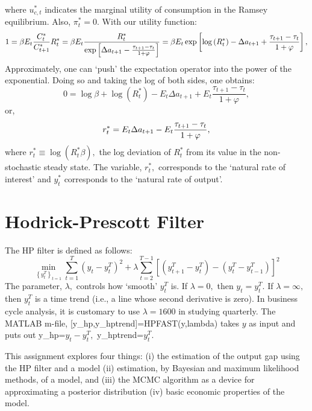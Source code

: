 \documentclass[12pt,thmsa]{article}
\begin{document}
where $u_{c,t}^{\ast }$ indicates the marginal utility of consumption in the
Ramsey equilibrium. Also, $\pi _{t}^{\ast }=0.$ With our utility function:%
\begin{equation*}
1=\beta E_{t}\frac{C_{t}^{\ast }}{C_{t+1}^{\ast }}R_{t}^{\ast }=\beta E_{t}%
\frac{R_{t}^{\ast }}{\exp \left[ \Delta a_{t+1}-\frac{\tau _{t+1}-\tau _{t}}{%
1+\varphi }\right] }=\beta E_{t}\exp \left[ \log \left( R_{t}^{\ast }\right)
-\Delta a_{t+1}+\frac{\tau _{t+1}-\tau _{t}}{1+\varphi }\right] ,
\end{equation*}%
Approximately, one can `push' the expectation operator into the power of the
exponential. Doing so and taking the log of both sides, one obtains:%
\begin{equation*}
0=\log \beta +\log \left( R_{t}^{\ast }\right) -E_{t}\Delta a_{t+1}+E_{t}%
\frac{\tau _{t+1}-\tau _{t}}{1+\varphi },
\end{equation*}%
or,%
\begin{equation*}
r_{t}^{\ast }=E_{t}\Delta a_{t+1}-E_{t}\frac{\tau _{t+1}-\tau _{t}}{%
1+\varphi },
\end{equation*}%
where $r_{t}^{\ast }\equiv \log \left( R_{t}^{\ast }\beta \right) ,$ the log
deviation of $R_{t}^{\ast }$ from its value in the non-stochastic steady
state. The variable, $r_{t}^{\ast },$ corresponds to the `natural rate of
interest' and $y_{t}^{\ast }$ corresponds to the `natural rate of output'.

\section{Hodrick-Prescott Filter}

The HP filter is defined as follows:%
\begin{equation*}
\min_{\left\{ y_{t}^{T}\right\} _{t=1}}\sum_{t=1}^{T}\left(
y_{t}-y_{t}^{T}\right) ^{2}+\lambda \sum_{t=2}^{T-1}\left[ \left(
y_{t+1}^{T}-y_{t}^{T}\right) -\left( y_{t}^{T}-y_{t-1}^{T}\right) \right]
^{2}
\end{equation*}%
The parameter, $\lambda ,$ controls how `smooth' $y_{t}^{T}$ is. If $\lambda
=0,$ then $y_{t}=y_{t}^{T}.$ If $\lambda =\infty ,$ then $y_{t}^{T}$ is a
time trend (i.e., a line whose second derivative is zero). In business cycle
analysis, it is customary to use $\lambda =1600$ in studying quarterly. The
MATLAB m-file, [y\_hp,y\_hptrend]=HPFAST(y,lambda) takes $y$ as input and
puts out y\_hp=$y_{t}-y_{t}^{T},$ y\_hptrend=$y_{t}^{T}.$

This assignment explores four things: (i) the estimation of the output gap
using the HP filter and a model (ii) estimation, by Bayesian and maximum
likelihood methods, of a model, and (iii) the MCMC algorithm as a device for
approximating a posterior distribution (iv) basic economic properties of the
model.
\end{document}
